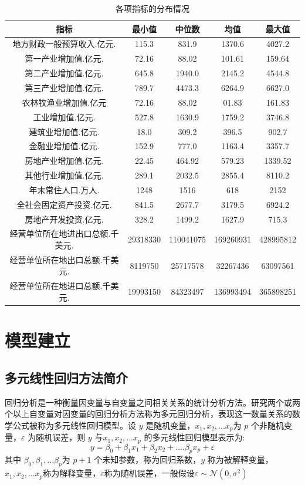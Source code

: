 \documentclass [a4paper]{article}
\begin{document}
\begin{table}[h]
\centering
\caption{各项指标的分布情况}
\small %
\begin{tabular}{ccccc}
\toprule
指标&最小值&中位数&均值&最大值\\
\midrule
地方财政一般预算收入.亿元.&	115.3	&	 831.9	&	1370.6	&	4027.2\\
第一产业增加值.亿元.	&	72.16	&	 88.02&	101.61&	159.64\\
第二产业增加值.亿元.&	 645.8	&	1940.0&	2145.2&	4544.8\\
第三产业增加值.亿元.	&	789.7&	 4473.3	&	 6264.9&	6627.0\\
农林牧渔业增加值.亿元&	 72.16&	88.02&	01.83	&	161.83\\
工业增加值.亿元.	&	527.8	&	1630.9	&	1759.2&	3746.8\\
建筑业增加值.亿元.	&	18.0&	309.2	&	396.5	&	902.7\\
金融业增加值.亿元.	&	152.9&	777.0	&	1163.4&	3357.7\\
房地产业增加值.亿元.	&	 22.45	&	 464.92	&	579.23&	1339.52\\
其他行业增加值.亿元.	&	 289.1	&	2032.5	&	2855.4&	8110.2\\
年末常住人口.万人.	&	1248&	1516	&	618	&	2152\\
全社会固定资产投资.亿元.&	841.5	&	2677.7&	3179.5&	6924.2\\
房地产开发投资.亿元.	&	 328.2	&	1499.2&	1627.9	&	715.3\\
经营单位所在地进出口总额.千美元.&	29318330&	110041075	&	169260931	&	428995812\\
经营单位所在地出口总额.千美元.&	8119750	&	25717578&	32267436&	63097561\\
经营单位所在地进口总额.千美元.&	 19993150	&	 84323497&	136993494&	365898251\\
\bottomrule
\end{tabular}
\end{table}

\section{模型建立}
\subsection{多元线性回归方法简介}

回归分析是一种衡量因变量与自变量之间相关关系的统计分析方法。研究两个或两个以上自变量对因变量的回归分析方法称为多元回归分析，表现这一数量关系的数学公式被称为多元线性回归模型。设 $y$ 是随机变量，$x_1,x_2,...x_p$为 $p$ 个非随机变量，$\varepsilon$ 为随机误差，则 $y$ 与$x_1,x_2,...x_p$ 的多元线性回归模型表示为:
$$
y =\beta_0 +\beta_1x_1 +\beta_2x_2+....\beta_px_p +\varepsilon
$$
 其中 $\beta_0,\beta_1,...\beta_p$为 $p+1$ 个未知参数，称为回归系数，$y$ 称为被解释变量，$x_1,x_2,...x_p$称为解释变量，$\varepsilon$称为随机误差，一般假设$\varepsilon \sim \mathcal{N}(0,\sigma^2)$
\end{document}
